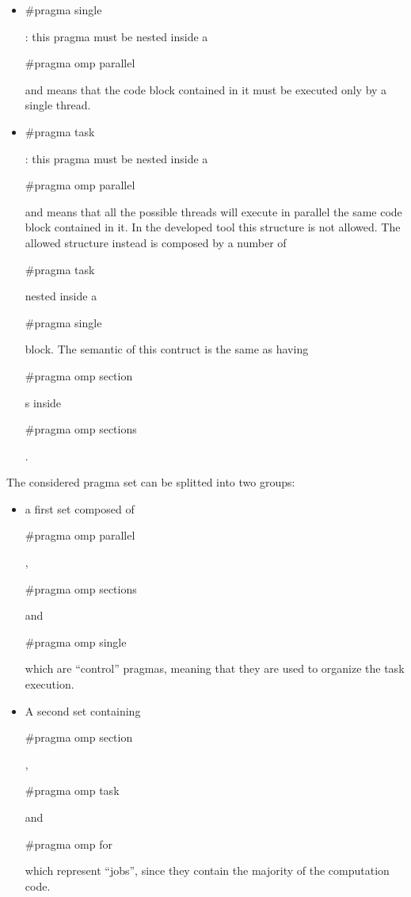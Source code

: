\documentclass[a4paper,11pt,oneside]{book}
\begin{document}
\begin{itemize}
\item{\begin{bf}{$\#$pragma single}\end{bf} : this pragma must be nested inside a \begin{bf}{$\#$pragma omp parallel }\end{bf} and means that the code block contained in it must be executed only by a single thread.}
\item{\begin{bf}{$\#$pragma task}\end{bf} : this pragma must be nested inside a \begin{bf}{$\#$pragma omp parallel }\end{bf} and means that all the possible threads will execute in parallel the same code block contained in it. In the developed tool this structure is not allowed. The allowed structure instead is composed by a number of \begin{bf}{$\#$pragma task}\end{bf} nested inside a \begin{bf}{$\#$pragma single}\end{bf} block. The semantic of this contruct is the same as  having \begin{bf}{$\#$pragma omp section}\end{bf}s inside \begin{bf}{$\#$pragma omp sections}\end{bf}.}
\end{itemize}
The considered pragma set can be splitted into two groups: 
\begin{itemize}
\item{a first set composed of \begin{bf}{$\#$pragma omp parallel}\end{bf}, \begin{bf}{$\#$pragma omp sections}\end{bf} and \begin{bf}{ $\#$pragma omp single}\end{bf} which are “control” pragmas, meaning that they are used to organize the task execution.}
\item{A second set containing \begin{bf}{$\#$pragma omp section}\end{bf}, \begin{bf}{$\#$pragma omp task}\end{bf} and \begin{bf}{$\#$pragma omp for}\end{bf} which represent “jobs”, since they contain the majority of the computation code.}
\end{itemize}
\end{document}
